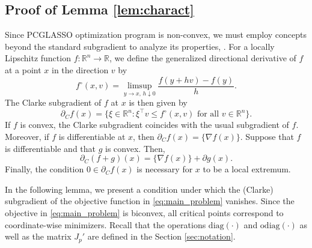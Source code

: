 \documentclass[12pt]{amsart}
\numberwithin{equation}{section}
\numberwithin{equation}{section}
\theoremstyle{plain}
\theoremstyle{definition}
\newcommand{\diag}[1]{\mathrm{diag}(#1)}
\newcommand{\odiag}[1]{\mathrm{odiag}(#1)}
\newcommand{\R}{\mathbb{R}}
\begin{document}
\subsection{Proof of Lemma \ref{lem:charact}}

Since PCGLASSO optimization program is non-convex, we must employ concepts beyond the standard subgradient to analyze its properties, \cite{nonconvex}.
For a locally Lipschitz function $f\colon \R^n\to\R$, we define the generalized directional derivative of $f$ at a point $x$ in the direction $v$ by 
\[
f^\circ(x,v) = \limsup_{y\to x,\, h\downarrow0} \frac{f(y+h v)-f(y)}{h}.
\]
The Clarke subgradient of $f$ at $x$ is then given by
\[
\partial_C f(x) = \{ \xi\in\R^n\colon\xi^\top v \leq f^\circ(x,v)\mbox{ for all }v\in\R^n\}. 
\]
If $f$ is convex, the Clarke subgradient coincides with the usual subgradient of $f$. Moreover, if $f$ is differentiable at $x$, then $\partial_C f(x) = \{\nabla f(x)\}$.  Suppose that $f$ is differentiable and that $g$ is convex. Then, 
\[
\partial_C(f+g)(x)= \{ \nabla f(x)\} + \partial g(x). 
\]
Finally, the condition $0\in\partial_C f(x)$ is necessary for $x$ to be a local extremum. 

In the following lemma, we present a condition under which the (Clarke) subgradient of the objective function in \eqref{eq:main_problem} vanishes. Since the objective in \eqref{eq:main_problem} is biconvex, all critical points correspond to coordinate-wise minimizers. Recall that the operations $\diag{\cdot}$ and $\odiag{\cdot}$ as well as the matrix $J_p'$ are defined in the Section \ref{sec:notation}.
\end{document}
